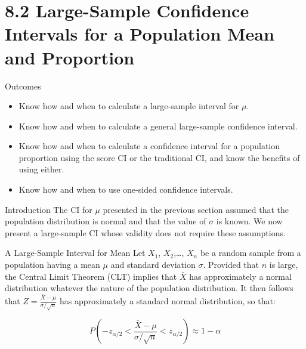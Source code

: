 \documentclass[
  ignorenonframetext,
]{beamer}
\providecommand{\tightlist}{%
  \setlength{\itemsep}{0pt}\setlength{\parskip}{0pt}}\usepackage{longtable,booktabs,array}
\begin{document}
\hypertarget{large-sample-confidence-intervals-for-a-population-mean-and-proportion}{%
\section{8.2 Large-Sample Confidence Intervals for a Population Mean and
Proportion}\label{large-sample-confidence-intervals-for-a-population-mean-and-proportion}}

\begin{frame}{Outcomes}
\protect\hypertarget{outcomes-1}{}
\begin{itemize}[<+->]
\tightlist
\item
  Know how and when to calculate a large-sample interval for \(\mu\).
\item
  Know how and when to calculate a general large-sample confidence
  interval.
\item
  Know how and when to calculate a confidence interval for a population
  proportion using the score CI or the traditional CI, and know the
  benefits of using either.
\item
  Know how and when to use one-sided confidence intervals.
\end{itemize}
\end{frame}

\begin{frame}{Introduction}
\protect\hypertarget{introduction-3}{}
The CI for \(\mu\) presented in the previous section assumed that the
population distribution is normal and that the value of \(\sigma\) is
known. We now present a large-sample CI whose validity does not require
these assumptions.
\end{frame}

\begin{frame}{A Large-Sample Interval for Mean}
\protect\hypertarget{a-large-sample-interval-for-mean}{}
Let \(X_{1}\), \(X_{2}\),\ldots, \(X_{n}\) be a random sample from a
population having a mean \(\mu\) and standard deviation \(\sigma\).
Provided that \(n\) is large, the Central Limit Theorem (CLT) implies
that \(\bar{X}\) has approximately a normal distribution whatever the
nature of the population distribution. It then follows that
\(Z = \frac{\bar{X}-\mu}{\sigma/\sqrt{n}}\) has approximately a standard
normal distribution, so that:

\[
P\left(-z_{\alpha/2} < \frac{\bar{X} - \mu}{\sigma/\sqrt{n}} < z_{\alpha/2}\right) \approx 1 - \alpha
\]
\end{frame}
\end{document}
